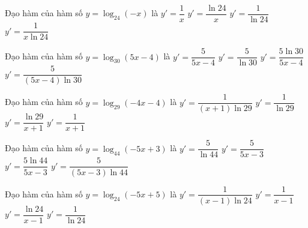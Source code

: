 \documentclass[12pt,a4paper]{article}
\begin{document}
\begin{ex}
Đạo hàm của hàm số $y=\log_{24}(-x)$ là
\choice
{$y'=\dfrac{1}{x}$}
{$y'=\dfrac{\ln{24}}{x}$}
{$y'=\dfrac{1}{\ln{24}}$}
{\True $y'=\dfrac{1}{x\ln 24}$}
\end{ex}
\begin{ex}
Đạo hàm của hàm số $y=\log_{30}(5x-4)$ là
\choice
{$y'=\dfrac{5}{5x-4}$}
{$y'=\dfrac{5}{\ln{30}}$}
{$y'=\dfrac{5\ln{30}}{5x-4}$}
{\True $y'=\dfrac{5}{(5x-4)\ln 30}$}
\end{ex}
\begin{ex}
Đạo hàm của hàm số $y=\log_{29}(-4x-4)$ là
\choice
{\True $y'=\dfrac{1}{(x+1)\ln 29}$}
{$y'=\dfrac{1}{\ln{29}}$}
{$y'=\dfrac{\ln{29}}{x+1}$}
{$y'=\dfrac{1}{x+1}$}
\end{ex}
\begin{ex}
Đạo hàm của hàm số $y=\log_{44}(-5x+3)$ là
\choice
{$y'=\dfrac{5}{\ln{44}}$}
{$y'=\dfrac{5}{5x-3}$}
{$y'=\dfrac{5\ln{44}}{5x-3}$}
{\True $y'=\dfrac{5}{(5x-3)\ln 44}$}
\end{ex}
\begin{ex}
Đạo hàm của hàm số $y=\log_{24}(-5x+5)$ là
\choice
{\True $y'=\dfrac{1}{(x-1)\ln 24}$}
{$y'=\dfrac{1}{x-1}$}
{$y'=\dfrac{\ln{24}}{x-1}$}
{$y'=\dfrac{1}{\ln{24}}$}
\end{ex}

\end{document}
